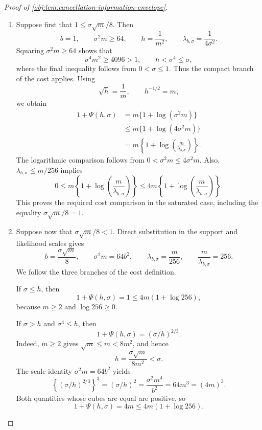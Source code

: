 \documentclass[11pt]{article}
\begin{document}
\begin{proof}[Proof of \cref{obj:lem:cancellation-information-envelope}]
\begin{enumerate}
\item Suppose first that \(1\le\sigma\sqrt m/8\). Then
\[
b=1,\qquad
\sigma^2m\ge64,\qquad
h=\frac1{m^2},\qquad
\lambda_{b,\sigma}=\frac1{4\sigma^2}.
\]
Squaring \(\sigma^2m\ge64\) shows that
\[
\sigma^4m^2\ge4096>1,
\qquad
h<\sigma^4\le\sigma,
\]
where the final inequality follows from \(0<\sigma\le1\).
Thus the compact branch of the cost applies. Using
\[
\sqrt h=\frac1m,\qquad h^{-1/2}=m,
\]
we obtain
\[
\begin{aligned}
1+\Psi(h,\sigma)
&=m\{1+\log(\sigma^2m)\}\\
&\le m\{1+\log(4\sigma^2m)\}\\
&=m\left\{1+\log\!\left(\frac{m}{\lambda_{b,\sigma}}\right)\right\}.
\end{aligned}
\]
The logarithmic comparison follows from
\(0<\sigma^2m\le4\sigma^2m\).
Also, \(\lambda_{b,\sigma}\le m/256\) implies
\[
0\le
m\left\{1+\log\!\left(\frac{m}{\lambda_{b,\sigma}}\right)\right\}
\le
4m\left\{1+\log\!\left(\frac{m}{\lambda_{b,\sigma}}\right)\right\}.
\]
This proves the required cost comparison in the saturated case, including the equality \(\sigma\sqrt m/8=1\).

\item Suppose now that \(\sigma\sqrt m/8<1\). Direct substitution in the support and likelihood scales gives
\[
b=\frac{\sigma\sqrt m}{8},
\qquad
\sigma^2m=64b^2,
\qquad
\lambda_{b,\sigma}=\frac m{256},
\qquad
\frac{m}{\lambda_{b,\sigma}}=256.
\]
We follow the three branches of the cost definition.

If \(\sigma\le h\), then
\[
1+\Psi(h,\sigma)=1
\le4m(1+\log256),
\]
because \(m\ge2\) and \(\log256\ge0\).

If \(\sigma>h\) and \(\sigma^4\le h\), then
\[
1+\Psi(h,\sigma)=(\sigma/h)^{2/3}.
\]
Indeed, \(m\ge2\) gives \(\sqrt m\le m<8m^2\), and hence
\[
h=\frac{\sigma\sqrt m}{8m^2}<\sigma.
\]
The scale identity \(\sigma^2m=64b^2\) yields
\[
\left\{(\sigma/h)^{2/3}\right\}^{3}
=(\sigma/h)^2
=\frac{\sigma^2m^4}{b^2}
=64m^3=(4m)^3.
\]
Both quantities whose cubes are equal are positive, so
\[
1+\Psi(h,\sigma)=4m\le4m(1+\log256).
\]


\end{enumerate}
\end{proof}
\end{document}

